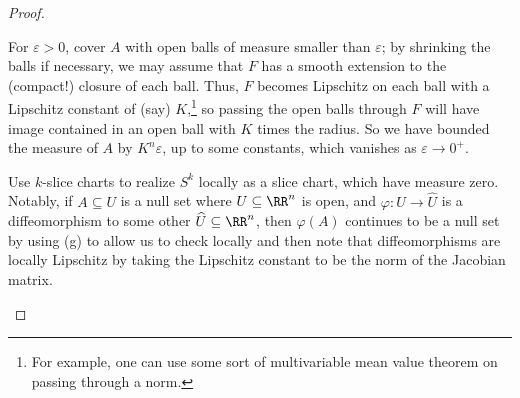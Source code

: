 \documentclass[../notes.tex]{subfiles}
\begin{document}
\begin{proof}
\begin{listalph}
		\item For $\varepsilon>0$, cover $A$ with open balls of measure smaller than $\varepsilon$; by shrinking the balls if necessary, we may assume that $F$ has a smooth extension to the (compact!) closure of each ball. Thus, $F$ becomes Lipschitz on each ball with a Lipschitz constant of (say) $K$,\footnote{For example, one can use some sort of multivariable mean value theorem on passing through a norm.} so passing the open balls through $F$ will have image contained in an open ball with $K$ times the radius. So we have bounded the measure of $A$ by $K^n\varepsilon$, up to some constants, which vanishes as $\varepsilon\to0^+$.
		\item Use $k$-slice charts to realize $S^k$ locally as a slice chart, which have measure zero. Notably, if $A\subseteq U$ is a null set where $U\subseteq\RR^n$ is open, and $\varphi\colon U\to\widehat U$ is a diffeomorphism to some other $\widehat U\subseteq\RR^n$, then $\varphi(A)$ continues to be a null set by using (g) to allow us to check locally and then note that diffeomorphisms are locally Lipschitz by taking the Lipschitz constant to be the norm of the Jacobian matrix.
		\qedhere
	\end{listalph}
\end{proof}


\end{document}
